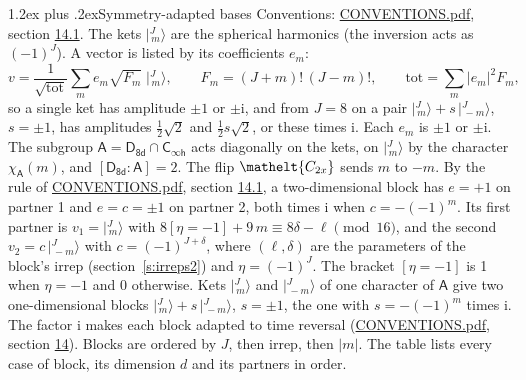 \documentclass[10pt,a4paper]{article}
\makeatletter
\renewcommand\section{\@startsection{section}{1}{\z@}{-3ex plus -1ex minus -.2ex}%
  {1.2ex plus .2ex}{\normalfont\large\sffamily\bfseries\color{parttitle}}}
\numberwithin{equation}{section}
\newcommand{\eltfont}[1]{{\let\sigma\eltsigma\mathelt{#1}}}
\newcommand{\grp}[1]{\mathsf{#1}}
\newcommand{\elt}[1]{\eltfont{#1}}
\newcommand{\grpindex}[2]{[#1 : #2]}
\newcommand{\iverson}[1]{[#1]}
\newcommand{\iunit}{\mathrm{i}}
\newcommand{\chiA}{\chi_{\grp{A}}}
\newcommand{\jm}[2]{\bigl\lvert{}^{#1}_{\,#2}\bigr\rangle}
\makeatother
\begin{document}
\section{Symmetry-adapted bases}\label{s:bases}
Conventions: \href{../../CONVENTIONS.pdf}{CONVENTIONS.pdf}, section \href{../../CONVENTIONS.pdf\#conv.14.1}{14.1}.
\leavevmode\label{n:index.m}\label{n:vector.ket}The kets $\jm{J}{m}$ are the spherical harmonics (the inversion acts as $(-1)^J$). \label{n:index.ketcoefficient}\label{n:vector.basis.symmetry}\label{n:index.ketweight}\label{n:index.total}A vector is listed by its coefficients $e_m$:
\begin{equation}\label{e:ket}v = \frac{1}{\sqrt{\mathrm{tot}}}\sum_m e_m\sqrt{F_m}\;\jm{J}{m},\qquad F_m = (J+m)!\,(J-m)!,\qquad \mathrm{tot} = \sum_m |e_m|^2F_m,\end{equation}
\leavevmode\label{n:index.pair.sign}so a single ket has amplitude $\pm1$ or $\pm\iunit$, and from $J = 8$ on a pair $\jm{J}{m} + s\,\jm{J}{-m}$, $s = \pm1$, has amplitudes $\tfrac{1}{2}\sqrt{2}$ and $\tfrac{1}{2}s\sqrt{2}$, or these times $\iunit$. Each $e_m$ is $\pm1$ or $\pm\iunit$.
\leavevmode\label{n:group.A}\label{n:function.character.abelian}The subgroup $\grp{A} = \grp{D_{8d}}\cap\grp{C_{\infty h}}$ acts diagonally on the kets, on $\jm{J}{m}$ by the character $\chiA(m)$, and $\grpindex{\grp{D_{8d}}}{\grp{A}} = 2$. The flip $\elt{C_{2x}}$ sends $m$ to $-m$. \label{n:index.partner.sign}By the rule of \href{../../CONVENTIONS.pdf}{CONVENTIONS.pdf}, section \href{../../CONVENTIONS.pdf\#conv.14.1}{14.1}, a two-dimensional block has $e = +1$ on partner 1 and $e = c = \pm1$ on partner 2, both times $\iunit$ when $c = -(-1)^m$. \label{n:index.eta}Its first partner is $v_1 = \jm{J}{m}$ with $8\iverson{\eta = -1} + 9\,m \equiv 8\delta - \ell \pmod{16}$, and the second $v_2 = c\,\jm{J}{-m}$ with $c = (-1)^{J+\delta}$, where $(\ell, \delta)$ are the parameters of the block's irrep (section~\ref{s:irreps2}) and $\eta = (-1)^J$. The bracket $\iverson{\eta = -1}$ is 1 when $\eta = -1$ and 0 otherwise. Kets $\jm{J}{m}$ and $\jm{J}{-m}$ of one character of $\grp{A}$ give two one-dimensional blocks $\jm{J}{m} + s\,\jm{J}{-m}$, $s = \pm1$, the one with $s = -(-1)^m$ times $\iunit$. The factor $\iunit$ makes each block adapted to time reversal (\href{../../CONVENTIONS.pdf}{CONVENTIONS.pdf}, section \href{../../CONVENTIONS.pdf\#conv.14}{14}). Blocks are ordered by $J$, then irrep, then $|m|$.
\leavevmode\label{n:head.case}\label{n:head.partners}The table lists every case of block, its dimension $d$ and its partners in order.
\end{document}
